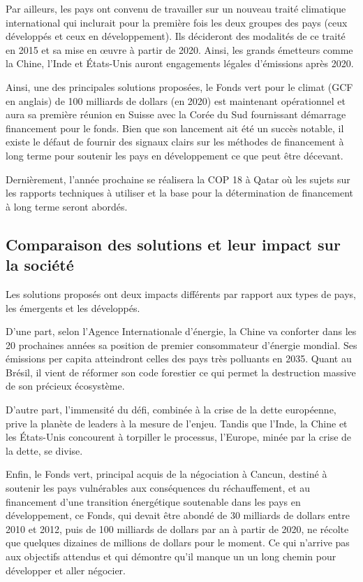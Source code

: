\documentclass[a4paper,10pt]{article}
\begin{document}
Par  ailleurs,  les  pays  ont  convenu  de travailler  sur  un  nouveau  traité
climatique international  qui inclurait pour  la première fois les  deux groupes
des  pays  (ceux  développés  et  ceux en  développement).  Ils  décideront  des
modalités de ce traité en 2015 et sa  mise en œuvre à partir de 2020. Ainsi, les
grands émetteurs comme la Chine, l'Inde et États-Unis auront engagements légales
d'émissions après 2020. 


Ainsi, une  des principales  solutions proposées, le  Fonds vert pour  le climat
(GCF  en  anglais)  de  100  milliards  de  dollars  (en  2020)  est  maintenant
opérationnel  et  aura sa  première  réunion  en Suisse  avec  la  Corée du  Sud
fournissant démarrage financement pour le fonds. Bien que son lancement ait été un
succès  notable, il  existe le  défaut  de fournir  des signaux  clairs sur  les
méthodes de financement à long terme  pour soutenir les pays en développement ce
que peut être décevant. 


Dernièrement, l’année prochaine se réalisera la COP 18 à Qatar où les sujets sur
les  rapports  techniques  à  utiliser  et  la base  pour  la  détermination  de
financement à long terme seront abordés.


\subsection{Comparaison des solutions et leur impact {\color{red}sur} la société}

Les solutions proposés ont deux impacts différents par rapport aux types de pays, les émergents et les développés.

D’une part, selon l'Agence Internationale  d'énergie, la Chine va conforter dans
les  20  prochaines  années   sa  position  de  premier  consommateur  d'énergie
mondial. Ses émissions per capita  atteindront celles des pays très polluants en
2035. Quant au Brésil, il vient de  réformer son code forestier ce qui permet la
destruction massive de son précieux écosystème. 


D’autre part, l'immensité  du défi, combinée à la crise  de la dette européenne,
prive la planète de leaders à la  mesure de l'enjeu. Tandis que l'Inde, la Chine
et les  États-Unis concourent à torpiller  le processus, l'Europe,  minée par la
crise de la dette, se divise. 


Enfin, le  Fonds vert, principal  acquis de la  négociation à Cancun,  destiné à
soutenir  les  pays  vulnérables   aux  conséquences  du  réchauffement,  et  au
financement   d'une  transition   énergétique  soutenable   dans  les   pays  en
développement, ce Fonds, qui devait être abondé de 30 milliards de dollars entre
2010 et  2012, puis  de 100 milliards  de dollars  par an à  partir de  2020, ne
récolte que  quelques dizaines  de millions  de dollars pour  le moment.  Ce qui
n’arrive pas  aux objectifs  attendus et  qui démontre qu’il  manque un  un long
chemin pour développer et aller négocier.
\end{document}
